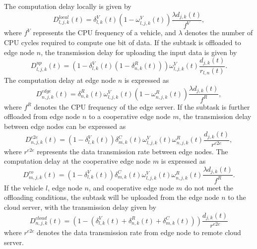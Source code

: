 \documentclass[lettersize,journal]{IEEEtran}
\begin{document}
The computation delay locally is given by
\begin{equation}
	\label{equ: local delay}
	D^{local}_{l,j,k}(t) = \delta^{V}_{l,k}(t)(1-\omega^{V}_{l,j,k}(t)) \frac{\lambda d_{j,k}(t)}{f^{V}},
\end{equation}
where $f^{V}$ represents the CPU frequency of a vehicle, and $\lambda$ denotes the number of CPU cycles required to compute one bit of data. If the subtask is offloaded to edge node $n$, the transmission delay for uploading the input data is given by
\begin{equation}
	\label{equ: uploaded to edge node delay}
	D_{l,j,k}^{up}(t) = \left( 1-\delta^{V}_{l,k}(t)(1-\delta^{R}_{n,k}(t)) \right) \omega^{V}_{l,j,k}(t)\frac{d_{j,k}(t)}{r_{l,n}(t)}.
\end{equation}
The computation delay at edge node $ n $ is expressed as 
\begin{equation}
	\label{equ: edge node delay}
	D^{edge}_{n,j,k}(t) = \delta^{R}_{n,k}(t)\omega^{V}_{l,j,k}(t)(1-\omega^{R}_{n,j,k}(t))\frac{\lambda d_{j,k}(t)}{f^{R}},
\end{equation}
where $f^{R}$ denotes the CPU frequency of the edge server. If the subtask is further offloaded from edge node $n$ to a cooperative edge node $m$, the transmission delay between edge nodes can be expressed as
\begin{equation}
	\label{equ: uploaded to coo edge delay}
	D_{n,j,k}^{e2e}(t) =(1-\delta^{V}_{l,k}(t))\delta^{C}_{m,k}(t)\omega^{V}_{l,j,k}(t)\omega^{R}_{n,j,k}(t)\frac{d_{j,k}(t)}{r^{e2e}},
\end{equation}
where $ r^{e2e} $ represents the data transmission rate between edge nodes.
The computation delay at the cooperative edge node $ m $ is expressed as 
\begin{equation}
	\label{coopertate edge delay}
	D^{co}_{m,j,k}(t) = (1-\delta^{V}_{l,k}(t))\delta^{C}_{m,k}(t)\omega^{V}_{l,j,k}(t)\omega^{R}_{n,j,k}(t)\frac{\lambda d_{j,k}(t)}{f^{R}}.
\end{equation}
If the vehicle $l$, edge node $n$, and cooperative edge node $m$ do not meet the offloading conditions, the subtask will be uploaded from the edge node $ n $ to the cloud server, with the transmission delay given by
\begin{equation}
	\label{equ: cloud delay}
	D^{cloud}_{n,j,k}(t) = \left( 1-\left( \delta^{V}_{l,k}(t) + \delta^{R}_{n,k}(t) +\delta^{C}_{m,k}(t) \right) \right) \frac{d_{j,k}(t)}{r^{e2c}}
\end{equation}
where $ r^{e2c} $ denotes the data transmission rate from edge node to remote cloud server. 
\end{document}
